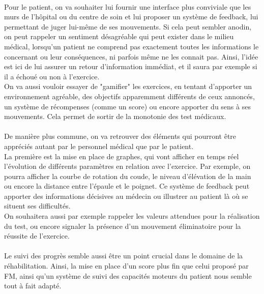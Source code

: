 \paragraph{}
Pour le patient, on va souhaiter lui fournir une interface plus conviviale que les murs de l'hôpital ou du centre de soin et lui
proposer un système de feedback, lui permettant de juger lui-même de ses mouvements. Si cela peut sembler anodin, on
peut rappeler un sentiment désagréable qui peut exister dans le milieu médical, lorsqu'un patient ne comprend pas exactement
toutes les informations le concernant ou leur conséquences, ni parfois même ne les connait pas. Ainsi, l'idée est ici de lui
assurer un retour d'information immédiat, et il saura par exemple si il a échoué ou non à l'exercice.\\
On va aussi vouloir essayer de "gamifier" les exercices, en tentant d'apporter un environnement agréable, des objectifs
apparemment différents de ceux annoncés, un système de récompenses (comme un score) ou encore apporter du sens
à ses mouvements. Cela permet de sortir de la monotonie des test médicaux.

\paragraph{}
De manière plus commune, on va retrouver des éléments qui pourront être appréciés autant par le personnel médical que par 
le patient. \\
La première est la mise en place de graphes, qui vont afficher en temps réel l'évolution de différents paramètres en relation
avec l'exercice. Par exemple, on pourra afficher la courbe de rotation du coude, le niveau d'élévation de la main ou encore la
distance entre l'épaule et le poignet. Ce système de feedback peut apporter des informations décisives au médecin ou
illustrer au patient là où se situent ses difficultés.\\
On souhaitera aussi par exemple rappeler les valeurs attendues pour la réalisation du test, ou encore signaler la présence
d'un mouvement éliminatoire pour la réussite de l'exercice.

\paragraph{}
Le suivi des progrès semble aussi être un point crucial dans le domaine de la réhabilitation. Ainsi, la mise en place d'un score
plus fin que celui proposé par FM, ainsi qu'un système de suivi des capacités moteurs du patient nous semble tout à fait
adapté.

